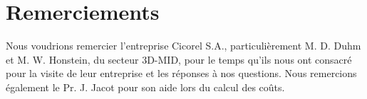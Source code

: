 \clearpage
\section{Remerciements}
Nous voudrions remercier l'entreprise Cicorel S.A., particulièrement M. D. Duhm et M. W. Honstein, du secteur 3D-MID, pour le temps qu'ils nous ont consacré pour la visite de leur entreprise et les réponses à nos questions.
Nous remercions également le Pr. J. Jacot pour son aide lors du calcul des coûts.
